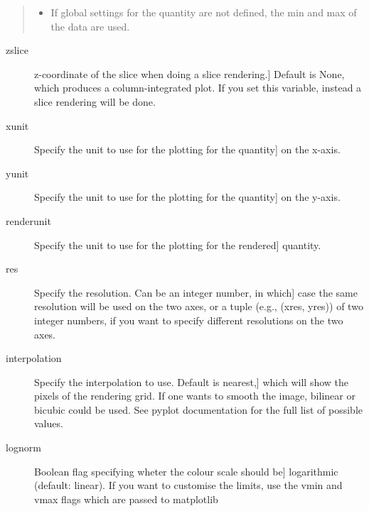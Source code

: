 \documentclass[letterpaper,10pt,english]{sphinxmanual}
\begin{document}
\begin{fulllineitems}
\begin{description}
\begin{quote}
\begin{itemize}
\item {} 
If global settings for the quantity are not defined,
the min and max of the data are used.

\end{itemize}
\end{quote}
\begin{description}
\item[{zslice}] \leavevmode{[}z-coordinate of the slice when doing a slice rendering.{]}
Default is None, which produces a column-integrated plot.
If you set this variable, instead a slice rendering will
be done.

\item[{xunit}] \leavevmode{[}Specify the unit to use for the plotting for the quantity{]}
on the x-axis.

\item[{yunit}] \leavevmode{[}Specify the unit to use for the plotting for the quantity{]}
on the y-axis.

\item[{renderunit}] \leavevmode{[}Specify the unit to use for the plotting for the rendered{]}
quantity.

\item[{res}] \leavevmode{[}Specify the resolution. Can be an integer number, in which{]}
case the same resolution will be used on the two axes, or a
tuple (e.g., (xres, yres)) of two integer numbers, if you
want to specify different resolutions on the two axes.

\item[{interpolation}] \leavevmode{[}Specify the interpolation to use. Default is nearest,{]}
which will show the pixels of the rendering grid. If one
wants to smooth the image, bilinear or bicubic could be
used. See pyplot documentation for the full list of
possible values.

\item[{lognorm}] \leavevmode{[}Boolean flag specifying wheter the colour scale should be{]}
logarithmic (default: linear). If you want to customise the
limits, use the vmin and vmax flags which are passed to
matplotlib

\end{description}

\end{description}

\end{fulllineitems}

\end{document}
